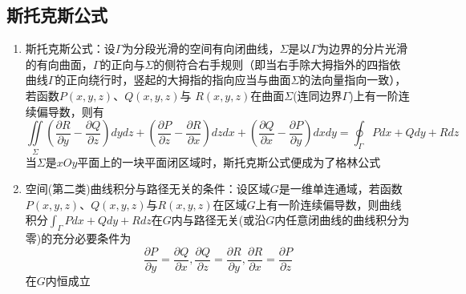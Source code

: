 \documentclass[12pt,a4paper,UTF8]{book}
\begin{document}
\subsection{斯托克斯公式}
\begin{enumerate}
\item 斯托克斯公式：设$\Gamma$为分段光滑的空间有向闭曲线，$\Sigma$是以$\Gamma$为边界的分片光滑的有向曲面，$\Gamma$的正向与$\Sigma$的侧符合右手规则（即当右手除大拇指外的四指依曲线$\Gamma$的正向绕行时，竖起的大拇指的指向应当与曲面$\Sigma$的法向量指向一致），若函数$P\left(x,y,z\right)$、$Q\left(x,y,z\right)$与 $R\left(x,y,z\right)$在曲面$\Sigma$(连同边界$\Gamma$)上有一阶连续偏导数，则有
\[\iint\limits_{\Sigma}\left(\frac{\partial R}{\partial y}-\frac{\partial Q}{\partial z}\right)dydz+\left(\frac{\partial P}{\partial z}-\frac{\partial R}{\partial x}\right)dzdx+\left(\frac{\partial Q}{\partial x}-\frac{\partial P}{\partial y}\right)dxdy=\oint_{\Gamma}Pdx+Qdy+Rdz\]
当$\Sigma$是$xOy$平面上的一块平面闭区域时，斯托克斯公式便成为了格林公式
\item 空间(第二类)曲线积分与路径无关的条件：设区域$G$是一维单连通域，若函数$P\left(x,y,z\right)$、$Q\left(x,y,z\right)$与$R\left(x,y,z\right)$在区域$G$上有一阶连续偏导数，则曲线积分$\int_{\Gamma}Pdx+Qdy+Rdz$在$G$内与路径无关(或沿$G$内任意闭曲线的曲线积分为零)的充分必要条件为
\[\frac{\partial P}{\partial y}=\frac{\partial Q}{\partial x},\frac{\partial Q}{\partial z}=\frac{\partial R}{\partial y},\frac{\partial R}{\partial x}=\frac{\partial P}{\partial z}\]
在$G$内恒成立
\end{enumerate}
\end{document}
